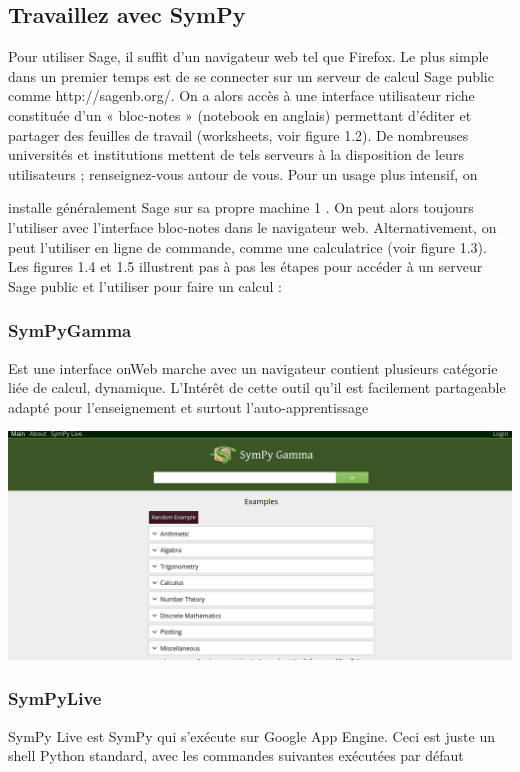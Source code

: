 \subsection{Travaillez avec SymPy}
Pour utiliser Sage, il suffit d’un navigateur web tel que Firefox. Le plus simple dans un premier temps est de se connecter sur un serveur de calcul Sage public comme http://sagenb.org/. On a alors accès à une interface utilisateur riche constituée d’un « bloc-notes » (notebook en anglais) permettant d’éditer
et partager des feuilles de travail (worksheets, voir figure 1.2). De nombreuses universités et institutions mettent de tels serveurs à la disposition de leurs utilisateurs ; renseignez-vous autour de vous. Pour un usage plus intensif, on

installe généralement Sage sur sa propre machine 1 . On peut alors toujours
l’utiliser avec l’interface bloc-notes dans le navigateur web. Alternativement, on
peut l’utiliser en ligne de commande, comme une calculatrice (voir figure 1.3).
Les figures 1.4 et 1.5 illustrent pas à pas les étapes pour accéder à un serveur
Sage public et l’utiliser pour faire un calcul :


\subsubsection{SymPyGamma}
Est une interface onWeb marche avec un navigateur contient plusieurs catégorie liée de calcul, dynamique. L’Intérêt de cette outil qu'il est facilement partageable adapté pour l’enseignement et surtout l'auto-apprentissage

\includegraphics[scale=0.3]{../Pictures/sympyGammaMain.png} 

\subsubsection{SymPyLive}
SymPy Live est SymPy qui s'exécute sur Google App Engine. Ceci est juste un shell Python standard, avec les commandes suivantes exécutées par défaut
